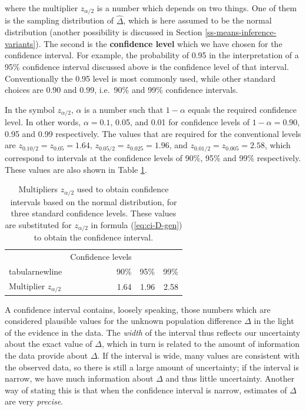 \documentclass[11pt,a4paper,openany]{book}
\begin{document}
where the multiplier \(z_{\alpha/2}\) is a number which depends on two
things. One of them is the sampling distribution of \(\hat{\Delta}\),
which is here assumed to be the normal distribution (another possibility
is discussed in Section \ref{ss-means-inference-variants}). The second
is the \textbf{confidence level} which we have chosen for the confidence
interval. For example, the probability of 0.95 in the interpretation of
a 95\% confidence interval discussed above is the confidence level of
that interval. Conventionally the 0.95 level is most commonly used,
while other standard choices are 0.90 and 0.99, i.e.~90\% and 99\%
confidence intervals.

In the symbol \(z_{\alpha/2}\), \(\alpha\) is a number such that
\(1-\alpha\) equals the required confidence level. In other words,
\(\alpha=0.1\), 0.05, and 0.01 for confidence levels of
\(1-\alpha=0.90\), 0.95 and 0.99 respectively. The values that are
required for the conventional levels are \(z_{0.10/2}=z_{0.05}=1.64\),
\(z_{0.05/2}=z_{0.025}=1.96\), and \(z_{0.01/2}=z_{0.005}=2.58\), which
correspond to intervals at the confidence levels of 90\%, 95\% and 99\%
respectively. These values are also shown in Table \ref{tab:t-ciq}.

\begin{longtable}[]{@{}lrrr@{}}
\caption{\label{tab:t-ciq} Multipliers \(z_{\alpha/2}\) used to obtain
confidence intervals based on the normal distribution, for three
standard confidence levels. These values are substituted for
\(z_{\alpha/2}\) in formula (\ref{eq:ci-D-gen}) to obtain the confidence
interval.}\tabularnewline
\toprule
& Confidence levels & \ & \\tabularnewline
& 90\% & 95\% & 99\%\tabularnewline
Multiplier \(z_{\alpha/2}\) & 1.64 & 1.96 & 2.58\tabularnewline
\bottomrule
\end{longtable}

A confidence interval contains, loosely speaking, those numbers which
are considered plausible values for the unknown population difference
\(\Delta\) in the light of the evidence in the data. The \emph{width} of
the interval thus reflects our uncertainty about the exact value of
\(\Delta\), which in turn is related to the amount of information the
data provide about \(\Delta\). If the interval is wide, many values are
consistent with the observed data, so there is still a large amount of
uncertainty; if the interval is narrow, we have much information about
\(\Delta\) and thus little uncertainty. Another way of stating this is
that when the confidence interval is narrow, estimates of \(\Delta\) are
very \emph{precise}.
\end{document}
